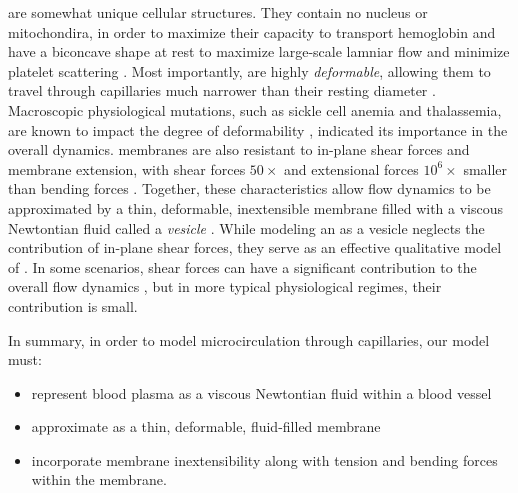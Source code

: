 \rbcs are somewhat unique cellular structures. 
They contain no nucleus or mitochondira, in order to maximize their capacity to transport hemoglobin \cite{zhang2011red} and have a biconcave shape at rest to maximize large-scale lamniar flow and minimize platelet scattering \cite{uzoigwe2006human}.
Most importantly, \rbcs are highly \textit{deformable}, allowing them to travel through capillaries much narrower than their resting diameter \cite{huisjes2018squeezing}.
Macroscopic physiological mutations, such as sickle cell anemia and thalassemia, are known to impact the degree of \rbc deformability \cite{huisjes2018squeezing}, indicated its importance in the overall dynamics.
\rbc membranes are also resistant to in-plane shear forces and membrane extension, with shear forces $50\times$ and extensional forces $10^6\times$ smaller than bending forces \cite{lee2008theoretical}.
Together, these characteristics allow \rbc flow dynamics to be approximated by a thin, deformable, inextensible membrane filled with a viscous Newtontian fluid called a \textit{vesicle} \cite{sackmann1996supported,kraus1996fluid}.
While modeling an \rbc as a vesicle neglects the contribution of in-plane shear forces, they serve as an effective qualitative model of \rbc.
In some scenarios, shear forces can have a significant contribution to the overall flow dynamics \cite{mills2004nonlinear,horobin2019red}, but in more typical physiological regimes, their contribution is small.

In summary, in order to model microcirculation through capillaries, our model must:
\begin{itemize}
    \item represent blood plasma as a viscous Newtontian fluid within a blood vessel
    \item approximate \rbcs as a thin, deformable, fluid-filled membrane 
    \item incorporate \rbc membrane inextensibility along with tension and bending forces within the membrane.
\end{itemize}

